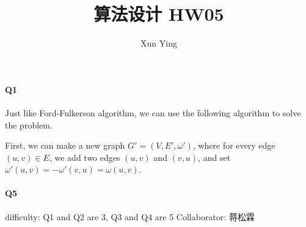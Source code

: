 \documentclass[UTF8]{ctexart}
\renewcommand{\(}{\left(}
\renewcommand{\)}{\right)}
\begin{document}
\title{算法设计 HW05}  
\author{Xun Ying}
\maketitle

\paragraph{Q1} 
Just like Ford-Fulkerson algorithm, we can use the following algorithm to solve the problem.

First, we can make a new graph $G' = (V, E', \omega ')$, where for every edge $(u,v) \in E$, we add two edges $(u,v)$ and $(v,u)$, and set $\omega '(u,v) = - \omega '(v,u) = \omega(u,v)$.




\paragraph{Q5}

difficulty: Q1 and Q2 are 3, Q3 and Q4 are 5
Collaborator: 蒋松霖
\end{document}
